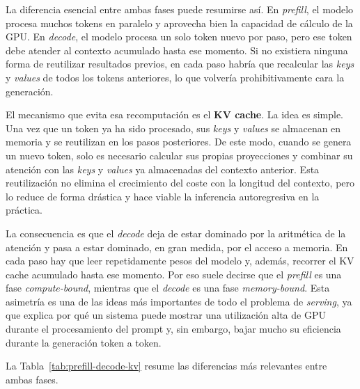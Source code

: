 La diferencia esencial entre ambas fases puede resumirse así. En \textit{prefill}, el modelo procesa muchos tokens en paralelo y aprovecha bien la capacidad de cálculo de la GPU. En \textit{decode}, el modelo procesa un solo token nuevo por paso, pero ese token debe atender al contexto acumulado hasta ese momento. Si no existiera ninguna forma de reutilizar resultados previos, en cada paso habría que recalcular las \textit{keys} y \textit{values} de todos los tokens anteriores, lo que volvería prohibitivamente cara la generación.

El mecanismo que evita esa recomputación es el \textbf{KV cache}. La idea es simple. Una vez que un token ya ha sido procesado, sus \textit{keys} y \textit{values} se almacenan en memoria y se reutilizan en los pasos posteriores. De este modo, cuando se genera un nuevo token, solo es necesario calcular sus propias proyecciones y combinar su atención con las \textit{keys} y \textit{values} ya almacenadas del contexto anterior. Esta reutilización no elimina el crecimiento del coste con la longitud del contexto, pero lo reduce de forma drástica y hace viable la inferencia autoregresiva en la práctica.

La consecuencia es que el \textit{decode} deja de estar dominado por la aritmética de la atención y pasa a estar dominado, en gran medida, por el acceso a memoria. En cada paso hay que leer repetidamente pesos del modelo y, además, recorrer el KV cache acumulado hasta ese momento. Por eso suele decirse que el \textit{prefill} es una fase \textit{compute-bound}, mientras que el \textit{decode} es una fase \textit{memory-bound}. Esta asimetría es una de las ideas más importantes de todo el problema de \textit{serving}, ya que explica por qué un sistema puede mostrar una utilización alta de GPU durante el procesamiento del prompt y, sin embargo, bajar mucho su eficiencia durante la generación token a token.

La Tabla~\ref{tab:prefill-decode-kv} resume las diferencias más relevantes entre ambas fases.

